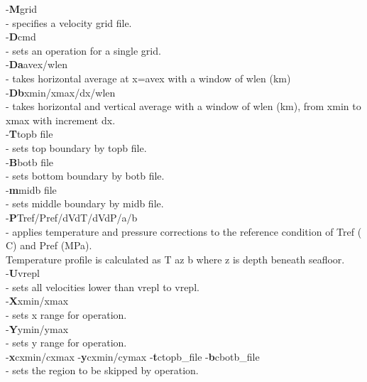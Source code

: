 \documentclass[twoside,final,onecolumn]{article}
\newcommand{\forceindent}{\leavevmode{\parindent=1em\indent}}
\begin{document}
\forceindent -\textbf{M}grid \\
\forceindent\forceindent - specifies a velocity grid file.\\[6pt]
\forceindent -\textbf{D}cmd \\
\forceindent\forceindent - sets an operation for a single grid.\\[6pt]
\forceindent\forceindent -\textbf{Da}avex/wlen \\
\forceindent\forceindent\forceindent - takes horizontal average at x=avex with a window of wlen (km) \\[6pt]
\forceindent\forceindent -\textbf{Db}xmin/xmax/dx/wlen \\
\forceindent\forceindent\forceindent - takes horizontal and vertical average with a window of wlen (km), from xmin to xmax with increment dx.\\[6pt]
\forceindent -\textbf{T}topb file \\
\forceindent\forceindent - sets top boundary by topb file.\\[6pt]
\forceindent -\textbf{B}botb file \\
\forceindent\forceindent - sets bottom boundary by botb file.\\[6pt]
\forceindent -\textbf{m}midb file \\
\forceindent\forceindent - sets middle boundary by midb file.\\[6pt]
\forceindent -\textbf{P}Tref/Pref/dVdT/dVdP/a/b \\
\forceindent\forceindent - applies temperature and pressure corrections to the reference condition of Tref ( C) and Pref (MPa). \\
\forceindent\forceindent Temperature profile is calculated as T az b where z is depth beneath seafloor. \\[6pt]
\forceindent -\textbf{U}vrepl \\
\forceindent\forceindent - sets all velocities lower than vrepl to vrepl.\\[6pt]
\forceindent -\textbf{X}xmin/xmax \\
\forceindent\forceindent - sets x range for operation.\\[6pt]
\forceindent -\textbf{Y}ymin/ymax \\
\forceindent\forceindent - sets y range for operation.\\[6pt]
\forceindent -\textbf{x}cxmin/cxmax -\textbf{y}cxmin/cymax -\textbf{t}ctopb\_file -\textbf{b}cbotb\_file \\
\forceindent\forceindent- sets the region to be skipped by operation.
\end{document}
